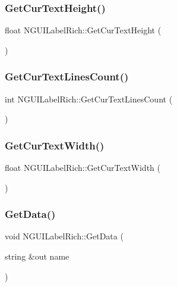 \subsubsection{\texorpdfstring{Get\+Cur\+Text\+Height()}{GetCurTextHeight()}}
{\footnotesize\ttfamily float N\+G\+U\+I\+Label\+Rich\+::\+Get\+Cur\+Text\+Height (\begin{DoxyParamCaption}{ }\end{DoxyParamCaption})}

\hypertarget{class_n_g_u_i_label_rich_a2a255b85dfe33461fa01b31f4712e39e}{}\label{class_n_g_u_i_label_rich_a2a255b85dfe33461fa01b31f4712e39e} 
\subsubsection{\texorpdfstring{Get\+Cur\+Text\+Lines\+Count()}{GetCurTextLinesCount()}}
{\footnotesize\ttfamily int N\+G\+U\+I\+Label\+Rich\+::\+Get\+Cur\+Text\+Lines\+Count (\begin{DoxyParamCaption}{ }\end{DoxyParamCaption})}

\hypertarget{class_n_g_u_i_label_rich_aedefb4e30103099e3bc3ef241af15dde}{}\label{class_n_g_u_i_label_rich_aedefb4e30103099e3bc3ef241af15dde} 
\subsubsection{\texorpdfstring{Get\+Cur\+Text\+Width()}{GetCurTextWidth()}}
{\footnotesize\ttfamily float N\+G\+U\+I\+Label\+Rich\+::\+Get\+Cur\+Text\+Width (\begin{DoxyParamCaption}{ }\end{DoxyParamCaption})}

\hypertarget{class_n_g_u_i_label_rich_a9874fa72186c5a74c9a5610050ea7037}{}\label{class_n_g_u_i_label_rich_a9874fa72186c5a74c9a5610050ea7037} 
\subsubsection{\texorpdfstring{Get\+Data()}{GetData()}}
{\footnotesize\ttfamily void N\+G\+U\+I\+Label\+Rich\+::\+Get\+Data (\begin{DoxyParamCaption}\item[{string \&out}]{name }\end{DoxyParamCaption})}

